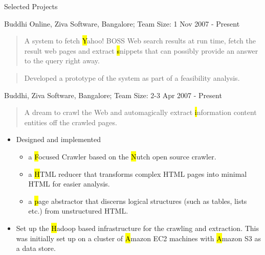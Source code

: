 \documentclass{resume}
\newcommand{\teamsize}{\sc\footnotesize Team Size: }
\begin{document}
\begin{category}{Selected Projects}{}

    \item {\topic Buddhi Online,} Ziva Software, Bangalore;
        {\teamsize 1}
        {\period Nov 2007 - Present}
        \begin{quote}
            A system to fetch {\hl Yahoo! BOSS} Web search results at run time,
            fetch the result web pages and extract {\hl snippets} that can possibly
            provide an answer to the query right away.
        \end{quote}
        \begin{quote}
            Developed a prototype of the system as part of a feasibility analysis.
        \end{quote}

    \item {\topic Buddhi,} Ziva Software, Bangalore;
        {\teamsize 2-3}
        {\period Apr 2007 - Present}
        \begin{quote}
            A dream to crawl the Web and automagically extract {\hl information
            content entities} off the crawled pages.
        \end{quote}

            \begin{itemize}
                \item Designed and implemented
                    \begin{itemize}
                        \item a {\hl Focused Crawler} based on the {\hl Nutch} open
                            source crawler.
                        \item a {\hl HTML reducer} that transforms complex HTML
                            pages into minimal HTML for easier analysis.
                        \item a {\hl page abstractor} that discerns logical
                            structures (such as tables, lists etc.) from
                            unstructured HTML.
                    \end{itemize}
                \item Set up the {\hl Hadoop} based infrastructure for the crawling
                    and extraction.  This was initially set up on a cluster of {\hl
                    Amazon EC2} machines with {\hl Amazon S3} as a data store.
            \end{itemize}


\end{category}
\end{document}
